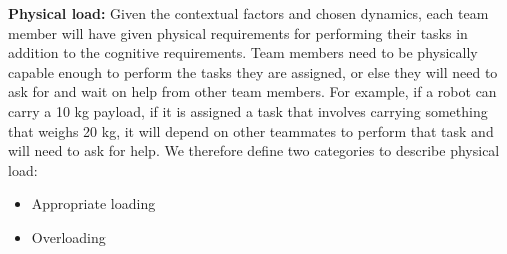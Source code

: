 \documentclass[letterpaper, 10 pt, conference]{ieeeconf}  %
\theoremstyle{definition}
\begin{document}
\textbf{Physical load:} Given the contextual factors and chosen dynamics, each team member will have given physical requirements for performing their tasks in addition to the cognitive requirements. Team members need to be physically capable enough to perform the tasks they are assigned, or else they will need to ask for and wait on help from other team members. For example, if a robot can carry a 10 kg payload, if it is assigned a task that involves carrying something that weighs 20 kg, it will depend on other teammates to perform that task and will need to ask for help. We therefore define two categories to describe physical load:
\begin{itemize}
    \item Appropriate loading
    \item Overloading
\end{itemize}



\printbibliography
\end{document}

